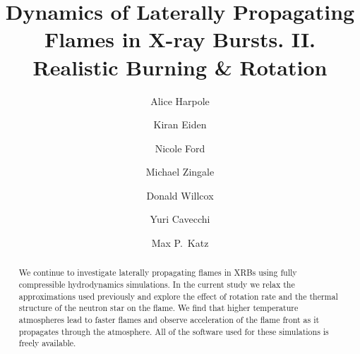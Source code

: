\documentclass[preprint,times,tighten]{aastex63}
\begin{document}
\title{Dynamics of Laterally Propagating Flames in X-ray Bursts. II. Realistic Burning \& Rotation}


\author[0000-0002-1530-781X]{Alice Harpole}

\author[0000-0001-6191-4285]{Kiran Eiden}

\author[0000-0001-8921-3624]{Nicole Ford}

\author[0000-0001-8401-030X]{Michael Zingale}

\author[0000-0003-2300-5165]{Donald Willcox}

\author[0000-0002-6447-3603]{Yuri Cavecchi}

\author[0000-0003-0439-4556]{Max P.\ Katz}




\begin{abstract}
We continue to investigate laterally propagating flames in XRBs using
fully compressible hydrodynamics simulations.  In the current study we
relax the approximations used previously and explore the effect of
rotation rate and the thermal structure of the neutron star on the
flame.  We find that higher temperature atmospheres lead to faster
flames and observe acceleration of the flame front as it propagates
through the atmosphere.  All of the software used for these
simulations is freely available.


\end{abstract}
\end{document}
